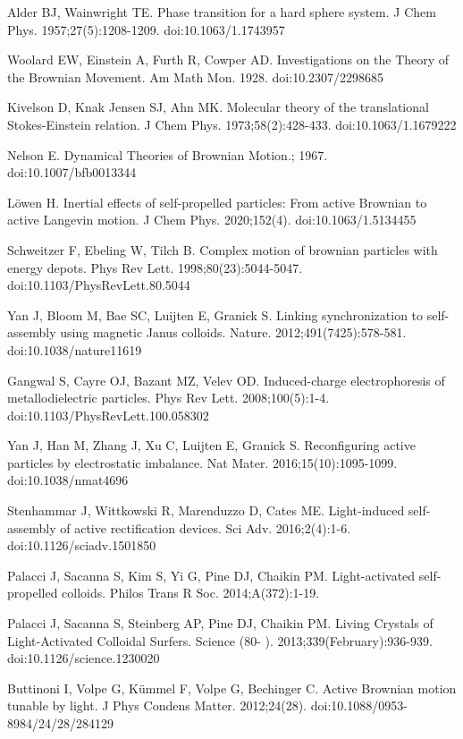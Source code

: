 \documentclass[11pt]{article}
\begin{document}
\begin{thebibliography}{9}
Alder BJ, Wainwright TE. Phase transition for a hard sphere system. J Chem Phys. 1957;27(5):1208-1209. doi:10.1063/1.1743957





Woolard EW, Einstein A, Furth R, Cowper AD. Investigations on the Theory of the Brownian Movement. Am Math Mon. 1928. doi:10.2307/2298685

Kivelson D, Knak Jensen SJ, Ahn MK. Molecular theory of the translational Stokes-Einstein relation. J Chem Phys. 1973;58(2):428-433. doi:10.1063/1.1679222

Nelson E. Dynamical Theories of Brownian Motion.; 1967. doi:10.1007/bfb0013344

Löwen H. Inertial effects of self-propelled particles: From active Brownian to active Langevin motion. J Chem Phys. 2020;152(4). doi:10.1063/1.5134455

Schweitzer F, Ebeling W, Tilch B. Complex motion of brownian particles with energy depots. Phys Rev Lett. 1998;80(23):5044-5047. doi:10.1103/PhysRevLett.80.5044

Yan J, Bloom M, Bae SC, Luijten E, Granick S. Linking synchronization to self-assembly using magnetic Janus colloids. Nature. 2012;491(7425):578-581. doi:10.1038/nature11619

Gangwal S, Cayre OJ, Bazant MZ, Velev OD. Induced-charge electrophoresis of metallodielectric particles. Phys Rev Lett. 2008;100(5):1-4. doi:10.1103/PhysRevLett.100.058302

Yan J, Han M, Zhang J, Xu C, Luijten E, Granick S. Reconfiguring active particles by electrostatic imbalance. Nat Mater. 2016;15(10):1095-1099. doi:10.1038/nmat4696

Stenhammar J, Wittkowski R, Marenduzzo D, Cates ME. Light-induced self-assembly of active rectification devices. Sci Adv. 2016;2(4):1-6. doi:10.1126/sciadv.1501850

Palacci J, Sacanna S, Kim S, Yi G, Pine DJ, Chaikin PM. Light-activated self-propelled colloids. Philos Trans R Soc. 2014;A(372):1-19.

Palacci J, Sacanna S, Steinberg AP, Pine DJ, Chaikin PM. Living Crystals of Light-Activated Colloidal Surfers. Science (80- ). 2013;339(February):936-939. doi:10.1126/science.1230020


Buttinoni I, Volpe G, Kümmel F, Volpe G, Bechinger C. Active Brownian motion tunable by light. J Phys Condens Matter. 2012;24(28). doi:10.1088/0953-8984/24/28/284129




\end{thebibliography}
\end{document}

